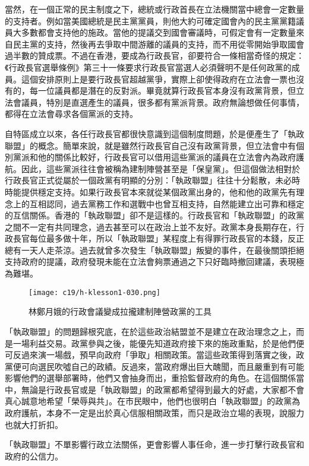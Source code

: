 當然，在一個正常的民主制度之下，總統或行政首長在立法機關當中總會一定數量的支持者。例如當美國總統是民主黨黨員，則他大約可確定國會內的民主黨黨籍議員大多數都會支持他的施政。當他的提議交到國會審議時，可假定會有一定數量來自民主黨的支持，然後再去爭取中間游離的議員的支持，而不用從零開始爭取國會過半數的贊成票。不過在香港，要成為行政長官，卻要符合一條相當奇怪的規定：《行政長官選舉條例》第三十一條要求行政長官當選人必須聲明不是任何政黨的成員。這個安排原則上是要行政長官超越黨爭，實際上卻使得政府在立法會一票也沒有的，每一位議員都是潛在的反對派。畢竟就算行政長官本身沒有政黨背景，但立法會議員，特別是直選產生的議員，很多都有黨派背景。政府無論想做任何事情，都得在立法會尋求各個黨派的支持。

自特區成立以來，各任行政長官都很快意識到這個制度問題，於是便產生了「執政聯盟」的概念。簡單來說，就是雖然行政長官自己沒有政黨背景，但立法會中有個別黨派和他的關係比較好，行政長官可以借用這些黨派的議員在立法會內為政府護航。因此，這些黨派往往會被稱為建制陣營甚至是「保皇黨」。但這個做法相對於行政長官正式從屬於一個政黨有明顯的分別：「執政聯盟」往往十分鬆散，未必時時能提供穩定支持。如果行政長官本來就從某個政黨出身的，他和他的政黨先有理念上的互相認同，過去黨務工作和選戰中也曾互相支持，自然能建立出可靠和穩定的互信關係。香港的「執政聯盟」卻不是這樣的。行政長官和「執政聯盟」的政黨之間不一定有共同理念，過去甚至可以在政治上並不友好。政黨本身長期存在，行政長官每位最多做十年，所以「執政聯盟」某程度上有得罪行政長官的本錢，反正總有一天人走茶涼。過去就曾多次發生「執政聯盟」叛變的事件，在最後關頭拒絕支持政府的提議，政府發現未能在立法會夠票通過之下只好臨時撤回建議，表現極為難堪。

\begin{figure}[htbp]
    \centering
    \texttt{[image: c19/h-klesson1-030.png]}
    \caption{林鄭月娥的行政會議變成拉攏建制陣營政黨的工具} 
\end{figure}

「執政聯盟」的問題歸根究底，在於這些政治結盟並不是建立在政治理念之上，而是一場利益交易。政黨參與之後，能優先知道政府接下來的施政重點，於是他們便可反過來演一場戲，預早向政府「爭取」相關政策。當這些政策得到落實之後，政黨便可向選民吹噓自己的政績。反過來，當政府爆出巨大醜聞，而且嚴重到有可能影響他們的選舉部署時，他們又會抽身而出，重拾監督政府的角色。在這個關係當中，無論是行政長官或是「執政聯盟」的政黨都希望得到最大的好處，大家都不會真心誠意地希望「榮辱與共」。在市民眼中，他們也很明白「執政聯盟」的政黨為政府護航，本身不一定是出於真心信服相關政策，而只是政治立場的表現，說服力也就大打折扣。

「執政聯盟」不單影響行政立法關係，更會影響人事任命，進一步打擊行政長官和政府的公信力。

